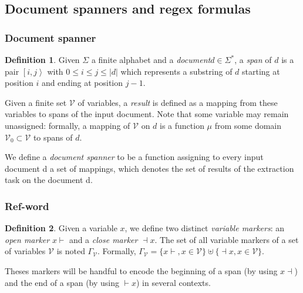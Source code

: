\documentclass[12px]{article}
\theoremstyle{definition}
\newtheorem{definition}{Definition}
\newcommand{\Span}[1]{\left[ #1 \right\rangle}
\begin{document}
    \subsection{Document spanners and regex formulas}

      \subsubsection{Document spanner}

        \begin{definition}
          Given $\Sigma$ a finite alphabet and a \textit{document}$ d \in
          \Sigma^*$, a \textit{span} of $d$ is a pair $\Span{i, j}$ with $0
          \leq i \leq j \leq |d|$ which represents a substring of $d$ starting
          at position $i$ and ending at position $j - 1$.
        \end{definition}

        Given a finite set $\mathcal{V}$ of variables, a \textit{result} is
        defined as a mapping from these variables to spans of the input
        document.  Note that some variable may remain unassigned: formally, a
        mapping of $\mathcal{V}$ on $d$ is a function $\mu$ from some domain
        $\mathcal{V}_0 \subset \mathcal{V}$ to spans of $d$.

        We define a \textit{document spanner} to be a function assigning to
        every input document d a set of mappings, which denotes the set of
        results of the extraction task on the document d.

      \subsubsection{Ref-word}

        \begin{definition}
          Given a variable $x$, we define two distinct \textit{variable
          markers}: an \textit{open marker} $x{\vdash}$ and a \textit{close
          marker} ${\dashv}x$. The set of all variable markers of a set of
          variables $\mathcal{V}$ is noted $\Gamma_\mathcal{V}$. Formally,
          $\Gamma_\mathcal{V} = \{x{\vdash}, x \in \mathcal{V}\} \uplus
          \{{\dashv}x, x \in \mathcal{V}\}$.
        \end{definition}

        Theses markers will be handful to encode the beginning of a span (by
        using $x{\dashv}$) and the end of a span (by using ${\vdash}x$) in
        several contexts.
\end{document}
